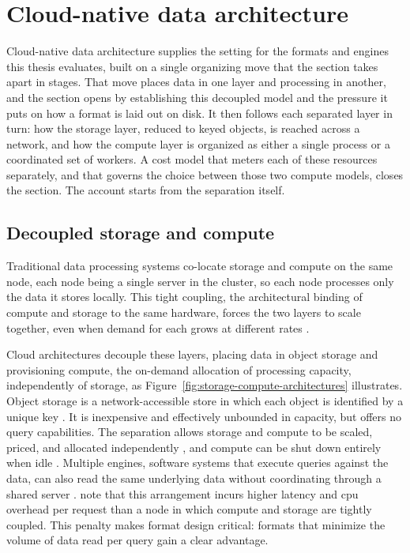 \section{Cloud-native data architecture}
\label{background:cloud-native-data-architecture}

Cloud-native data architecture supplies the setting for the formats and engines this thesis evaluates, built on a single organizing move that the section takes apart in stages. That move places data in one layer and processing in another, and the section opens by establishing this decoupled model and the pressure it puts on how a format is laid out on disk. It then follows each separated layer in turn: how the storage layer, reduced to keyed objects, is reached across a network, and how the compute layer is organized as either a single process or a coordinated set of workers. A cost model that meters each of these resources separately, and that governs the choice between those two compute models, closes the section. The account starts from the separation itself.

\subsection{Decoupled storage and compute} 
\label{background:cloud-native-data-architecture:decoupled-storage-and-compute}
Traditional data processing systems co-locate storage and compute on the same node, each node being a single server in the cluster, so each node processes only the data it stores locally. This tight coupling, the architectural binding of compute and storage to the same hardware, forces the two layers to scale together, even when demand for each grows at different rates \parencite{dageville2016_snowflake_elastic_data_warehouse}.

Cloud architectures decouple these layers, placing data in object storage and provisioning compute, the on-demand allocation of processing capacity, independently of storage, as Figure~\ref{fig:storage-compute-architectures} illustrates. Object storage is a network-accessible store in which each object is identified by a unique key \parencite{calder2011_windows_azure_storage,mesnier2003_object_based_storage}. It is inexpensive and effectively unbounded in capacity, but offers no query capabilities. The separation allows storage and compute to be scaled, priced, and allocated independently \parencite{pang2024_storage_disaggregated_databases}, and compute can be shut down entirely when idle \parencite{dageville2016_snowflake_elastic_data_warehouse}. Multiple engines, software systems that execute queries against the data, can also read the same underlying data without coordinating through a shared server \parencite{pang2024_storage_disaggregated_databases}. \textcite{dageville2016_snowflake_elastic_data_warehouse} note that this arrangement incurs higher latency and \acrshort{cpu} overhead per request than a node in which compute and storage are tightly coupled. This penalty makes format design critical: formats that minimize the volume of data read per query gain a clear advantage.

